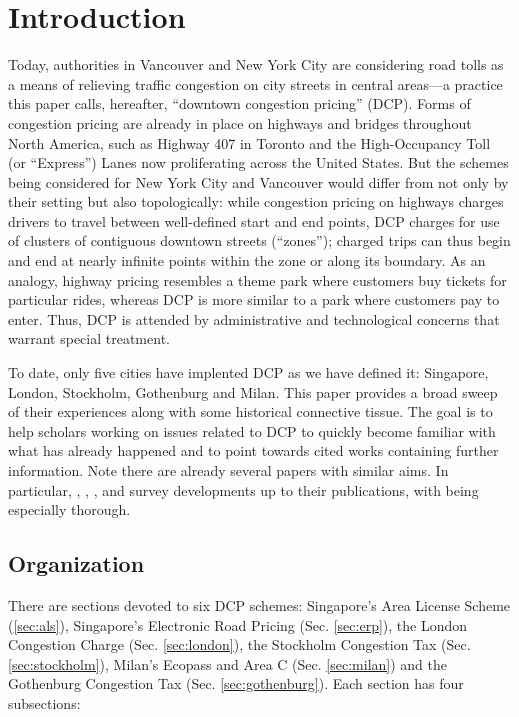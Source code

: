 \section{Introduction}

Today, authorities in Vancouver and New York City are considering road tolls as a means of relieving traffic congestion on city streets in central areas---a practice this paper calls, hereafter, ``downtown congestion pricing'' (DCP). Forms of congestion pricing are already in place on highways and bridges throughout North America, such as Highway 407 in Toronto and the High-Occupancy Toll (or ``Express'') Lanes now proliferating across the United States. But the schemes being considered for New York City and Vancouver would differ from not only by their setting but also topologically: while congestion pricing on highways charges drivers to travel between well-defined start and end points, DCP charges for use of  clusters of contiguous downtown streets (``zones''); charged trips can thus begin and end at nearly infinite points within the zone or along its boundary. As an analogy, highway pricing resembles a theme park where customers buy tickets for particular rides, whereas DCP is more similar to a park where customers pay to enter. Thus, DCP is attended by administrative and technological concerns that warrant special treatment.

To date, only five cities have implented DCP as we have defined it: Singapore, London, Stockholm, Gothenburg and Milan. This paper provides a broad sweep of their experiences along with some historical connective tissue. The goal is to help scholars working on issues related to DCP to quickly become familiar with what has already happened and to point towards cited works containing further information. Note there are already several papers with similar aims. In particular, \citet{Hau1992}, \citet{Gomez-Ibanez1994}, \citet{Small1998}, \citet{Walker2011} and \citet{Anas2011} survey developments up to their publications, with \citet{Gomez-Ibanez1994} being especially thorough. 

\subsection{Organization}

There are sections devoted to six DCP schemes: Singapore's Area License Scheme (\ref{sec:als}), Singapore's Electronic Road Pricing (Sec. \ref{sec:erp}), the London Congestion Charge (Sec. \ref{sec:london}), the Stockholm Congestion Tax (Sec. \ref{sec:stockholm}), Milan's Ecopass and Area C (Sec. \ref{sec:milan}) and the Gothenburg Congestion Tax (Sec. \ref{sec:gothenburg}). Each section has four subsections:

